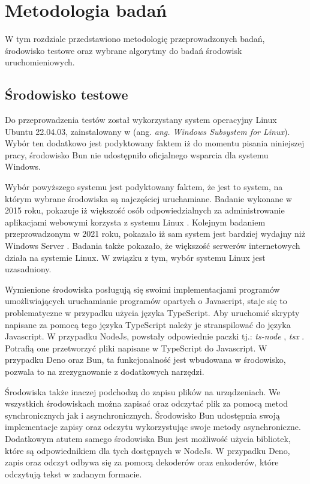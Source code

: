 \section{Metodologia badań}
W tym rozdziale przedstawiono metodologię przeprowadzonych badań, środowisko testowe oraz wybrane algorytmy do badań środowisk uruchomieniowych.

\subsection{Środowisko testowe}
Do przeprowadzenia testów został wykorzystany system operacyjny Linux Ubuntu 22.04.03, zainstalowany w (ang. \textit{ang. Windows Subsystem for Linux}). Wybór ten dodatkowo jest podyktowany faktem iż do momentu pisania niniejszej pracy, środowisko Bun nie udostępniło oficjalnego wsparcia dla systemu Windows.

Wybór powyższego systemu jest podyktowany faktem, że jest to system, na którym wybrane środowiska są najczęściej uruchamiane. Badanie wykonane w 2015 roku, pokazuje iż większość osób odpowiedzialnych za administrowanie aplikacjami webowymi korzysta z systemu Linux \cite{performance_comparison_linux}. Kolejnym badaniem przeprowadzonym w 2021 roku, pokazało iż sam system jest bardziej wydajny niż Windows Server \cite{web_server_performance}. Badania także pokazało, że większość serwerów internetowych działa na systemie Linux. W związku z tym, wybór systemu Linux jest uzasadniony.

Wymienione środowiska posługują się swoimi implementacjami programów umożliwiających uruchamianie programów opartych o Javascript, staje się to problematyczne w przypadku użycia języka TypeScript. Aby uruchomić skrypty napisane za pomocą tego języka TypeScript należy je stranspilować do języka Javascript. W przypadku NodeJs, powstały odpowiednie paczki tj.: \textit{ts-node} \cite{ts_node}, \textit{tsx} \cite{tsx}. Potrafią one przetworzyć pliki napisane w TypeScript do Javascript. W przypadku Deno oraz Bun, ta funkcjonalność jest wbudowana w środowisko, pozwala to na zrezygnowanie z dodatkowych narzędzi.

Środowiska także inaczej podchodzą do zapisu plików na urządzeniach. We wszystkich środowiskach można zapisać oraz odczytać plik za pomocą metod synchronicznych jak i asynchronicznych. Środowisko Bun udostępnia swoją implementacje zapisy oraz odczytu wykorzystując swoje metody asynchroniczne. Dodatkowym atutem samego środowiska Bun jest możliwość użycia bibliotek, które są odpowiednikiem dla tych dostępnych w NodeJs. W przypadku Deno, zapis oraz odczyt odbywa się za pomocą dekoderów oraz enkoderów, które odczytują tekst w zadanym formacie.

